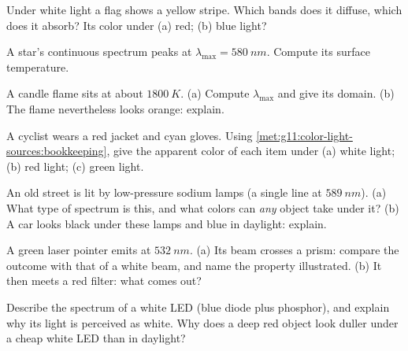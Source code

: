 \begin{exercise}[$\star$]\label{exo:g11:color-light-sources:4}
Under white light a flag shows a yellow stripe. Which bands does it
diffuse, which does it absorb? Its color under (a) red; (b) blue light?
\end{exercise}

\begin{exercise}[$\star$]\label{exo:g11:color-light-sources:5}
A star's continuous spectrum peaks at $\lambda_{\max} = \qty{580}{nm}$.
Compute its surface temperature.
\end{exercise}

\begin{exercise}[$\star\star$]\label{exo:g11:color-light-sources:6}
A candle flame sits at about $\qty{1800}{K}$. (a) Compute
$\lambda_{\max}$ and give its domain. (b) The flame nevertheless looks
orange: explain.
\end{exercise}

\begin{exercise}[$\star\star$]\label{exo:g11:color-light-sources:7}
A cyclist wears a red jacket and cyan gloves. Using
\cref{met:g11:color-light-sources:bookkeeping}, give the apparent color
of each item under (a) white light; (b) red light; (c) green light.
\end{exercise}

\begin{exercise}[$\star\star$]\label{exo:g11:color-light-sources:8}
An old street is lit by low-pressure sodium lamps (a single line at
$\qty{589}{nm}$). (a) What type of spectrum is this, and what colors
can \emph{any} object take under it? (b) A car looks black under these
lamps and blue in daylight: explain.
\end{exercise}

\begin{exercise}[$\star\star$]\label{exo:g11:color-light-sources:9}
A green laser pointer emits at $\qty{532}{nm}$. (a) Its beam crosses a
prism: compare the outcome with that of a white beam, and name the
property illustrated. (b) It then meets a red filter: what comes out?
\end{exercise}

\begin{exercise}[$\star\star$]\label{exo:g11:color-light-sources:10}
Describe the spectrum of a white LED (blue diode plus phosphor), and
explain why its light is perceived as white. Why does a deep red object
look duller under a cheap white LED than in daylight?
\end{exercise}

